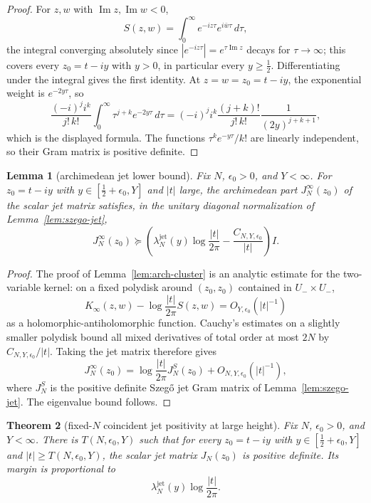 \documentclass[11pt]{amsart}
\newtheorem{theorem}{Theorem}[section]
\newtheorem{lemma}[theorem]{Lemma}
\theoremstyle{definition}
\theoremstyle{remark}
\theoremstyle{definition}
\renewcommand{\Im}{\operatorname{Im}}
\newcommand{\half}{\tfrac{1}{2}}
\begin{document}
\begin{proof}
For $z,w$ with $\Im z,\Im w<0$,
\[
   S(z,w)=\int_0^\infty e^{-iz\tau}e^{i\bar w\tau}\,d\tau,
\]
the integral converging absolutely since $|e^{-iz\tau}|=e^{\tau\Im z}$ decays for $\tau\to\infty$; this
covers every $z_0=t-iy$ with $y>0$, in particular every $y\ge\half$.
Differentiating under the integral gives the first identity.  At $z=w=z_0=t-iy$, the exponential
weight is $e^{-2y\tau}$, so
\[
   \frac{(-i)^ji^k}{j!\,k!}\int_0^\infty \tau^{j+k}e^{-2y\tau}\,d\tau
   =
   (-i)^ji^k\frac{(j+k)!}{j!\,k!}\frac1{(2y)^{j+k+1}},
\]
which is the displayed formula.  The functions $\tau^ke^{-y\tau}/k!$ are linearly independent, so
their Gram matrix is positive definite.
\end{proof}

\begin{lemma}[archimedean jet lower bound]\label{lem:arch-jet}
Fix $N$, $\epsilon_0>0$, and $Y<\infty$.  For $z_0=t-iy$ with
$y\in[\half+\epsilon_0,Y]$ and $|t|$ large, the archimedean part $J_N^\infty(z_0)$ of the scalar jet
matrix satisfies, in the unitary diagonal normalization of Lemma~\ref{lem:szego-jet},
\[
   J_N^\infty(z_0)
   \succeq
   \left(
      \lambda_N^{\mathrm{jet}}(y)\log\frac{|t|}{2\pi}
      -
      \frac{C_{N,Y,\epsilon_0}}{|t|}
   \right)I.
\]
\end{lemma}

\begin{proof}
The proof of Lemma~\ref{lem:arch-cluster} is an analytic estimate for the two-variable kernel:
on a fixed polydisk around $(z_0,z_0)$ contained in $U_-\times U_-$,
\[
   K_\infty(z,w)-\log\frac{|t|}{2\pi}S(z,w)=O_{Y,\epsilon_0}(|t|^{-1})
\]
as a holomorphic-antiholomorphic function.  Cauchy's estimates on a slightly smaller polydisk bound
all mixed derivatives of total order at most $2N$ by $C_{N,Y,\epsilon_0}/|t|$.  Taking the jet matrix
therefore gives
\[
   J_N^\infty(z_0)
   =
   \log\frac{|t|}{2\pi}J_N^S(z_0)+O_{N,Y,\epsilon_0}(|t|^{-1}),
\]
where $J_N^S$ is the positive definite Szeg\H{o} jet Gram matrix of Lemma~\ref{lem:szego-jet}.  The
eigenvalue bound follows.
\end{proof}

\begin{theorem}[fixed-$N$ coincident jet positivity at large height]\label{thm:jet-fixedN}
Fix $N$, $\epsilon_0>0$, and $Y<\infty$.  There is
$T(N,\epsilon_0,Y)$ such that for every $z_0=t-iy$ with
$y\in[\half+\epsilon_0,Y]$ and $|t|\ge T(N,\epsilon_0,Y)$, the scalar jet matrix
$J_N(z_0)$ is positive definite.  Its margin is proportional to
\[
   \lambda_N^{\mathrm{jet}}(y)\log\frac{|t|}{2\pi}.
\]
\end{theorem}
\end{document}
